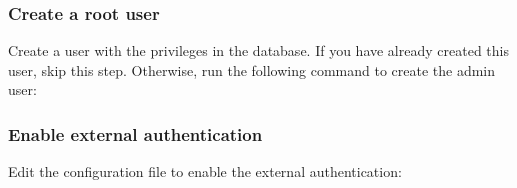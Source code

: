 \documentclass[letterpaper,10pt,english]{sphinxmanual}
\begin{document}
\subsubsection{Create a root user}
\label{\detokenize{sasl-auth:create-a-root-user}}\label{\detokenize{sasl-auth:root-user}}
\sphinxAtStartPar
Create a user with the  privileges in the  database. If you have already created this user, skip this step. Otherwise, run the following command to create the admin user:

\begin{sphinxVerbatim}[commandchars=\\\{\}]
\PYG{p}{[}\PYG{p}{]}
\PYG{p}{[}\PYG{p}{]}
\end{sphinxVerbatim}


\subsubsection{Enable external authentication}
\label{\detokenize{sasl-auth:enable-external-authentication}}
\sphinxAtStartPar
Edit the  configuration file to enable the external authentication:

\begin{sphinxVerbatim}[commandchars=\\\{\}]

\end{sphinxVerbatim}
\end{document}

